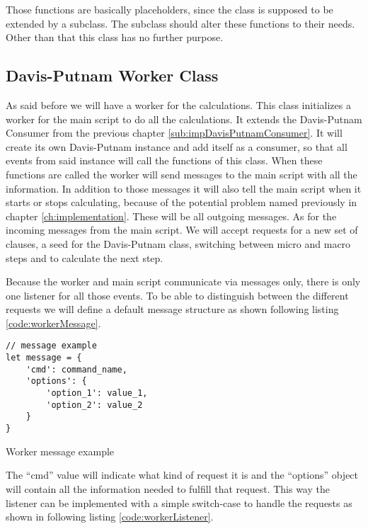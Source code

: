 Those functions are basically placeholders, since the class is supposed to be extended by a subclass. The subclass should alter these functions to their needs. Other than that this class has no further purpose.

\subsection{Davis-Putnam Worker Class}
\label{sub:impDavisPutnamWorker}
As said before we will have a worker for the calculations. This class initializes a worker for the main script to do all the calculations. It extends the Davis-Putnam Consumer from the previous chapter \ref{sub:impDavisPutnamConsumer}. It will create its own Davis-Putnam instance and add itself as a consumer, so that all events from said instance will call the functions of this class. When these functions are called the worker will send messages to the main script with all the information. In addition to those messages it will also tell the main script when it starts or stops calculating, because of the potential problem named previously in chapter \ref{ch:implementation}. These will be all outgoing messages. As for the incoming messages from the main script. We will accept requests for a new set of clauses, a seed for the Davis-Putnam class, switching between micro and macro steps and to calculate the next step.

Because the worker and main script communicate via messages only, there is only one listener for all those events. To be able to distinguish between the different requests we will define a default message structure as shown following listing \ref{code:workerMessage}.

\begin{listing}[h!]
\begin{verbatim}
// message example
let message = {
    'cmd': command_name,
    'options': {
        'option_1': value_1,
        'option_2': value_2
    }
}
\end{verbatim}
    \caption{Worker message example}
    \label{code:workerMessage}
\end{listing}

The ``cmd'' value will indicate what kind of request it is and the ``options'' object will contain all the information needed to fulfill that request. This way the listener can be implemented with a simple switch-case to handle the requests as shown in following listing \ref{code:workerListener}.

